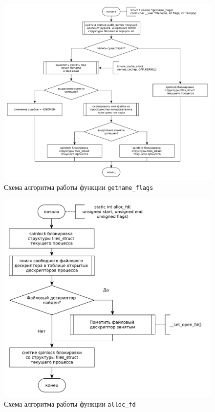 \begin{figure}[h!btp]
	\centering
	\includegraphics[width=490pt]{inc/getname_flags.pdf}
	\caption{Схема алгоритма работы функции \texttt{getname\_flags}}
\end{figure}

\clearpage

\begin{figure}[h!btp]
	\centering
	\includegraphics[width=490pt]{inc/alloc_fd.pdf}
	\caption{Схема алгоритма работы функции \texttt{alloc\_fd}}
\end{figure}


